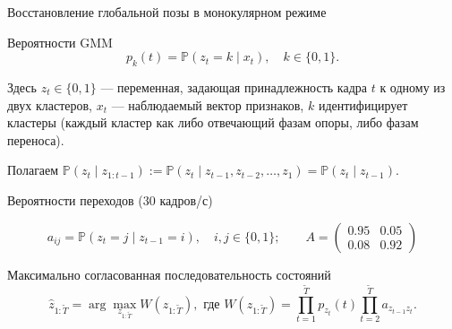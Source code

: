 \documentclass[9pt,aspectratio=169]{beamer}
\begin{document}
\begin{frame}{Восстановление глобальной позы в монокулярном режиме}

\begin{block}{Вероятности GMM}
\[
p_k(t) = \mathbb{P}(z_t = k \mid x_t), \quad k \in \{0,1\}.
\]

Здесь $z_t \in \{0,1\}$ --- переменная, задающая принадлежность кадра $t$ к одному из
двух кластеров, $x_t$ --- наблюдаемый вектор признаков, $k$ идентифицирует кластеры
(каждый кластер как либо отвечающий фазам опоры, либо фазам переноса).
\end{block}

Полагаем $\mathbb{P}(z_t \mid z_{1:t-1})
:=
\mathbb{P}(z_t \mid z_{t-1}, z_{t-2}, \dots, z_1)
=
\mathbb{P}(z_t \mid z_{t-1}).$

\begin{block}{Вероятности переходов (30 кадров/с)}

\[
a_{ij} = \mathbb{P}(z_t = j \mid z_{t-1} = i), \quad i,j \in \{0,1\};
\quad \quad
A =
\begin{pmatrix}
0.95 & 0.05 \\
0.08 & 0.92
\end{pmatrix}
\]

\end{block}


\begin{block}{Максимально согласованная последовательность состояний}
\[
\hat{z}_{1:\tilde{T}} =
\arg\max_{z_{1:\tilde{T}}}
W(z_{1:\tilde{T}}), \text{ где }
W(z_{1:\tilde{T}}) =
\prod_{t=1}^{\tilde{T}} p_{z_t}(t)
\prod_{t=2}^{\tilde{T}} a_{z_{t-1} z_t}.
\]
\end{block}

\end{frame}
\end{document}
